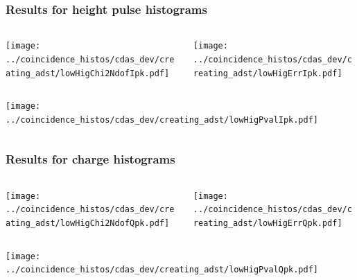 \documentclass[aspectratio=169]{beamer}
\begin{document}
\begin{frame}
  \frametitle{Results for height pulse histograms}

  \begin{columns} 
    \begin{column}{0.5\textwidth}
      \texttt{[image: ../coincidence\_histos/cdas\_dev/creating\_adst/lowHigChi2NdofIpk.pdf]}
    \end{column}

    \begin{column}{0.5\textwidth}
      \texttt{[image: ../coincidence\_histos/cdas\_dev/creating\_adst/lowHigErrIpk.pdf]}
    \end{column}
  \end{columns}

  \begin{columns}
    \begin{column}{0.5\textwidth}
      \texttt{[image: ../coincidence\_histos/cdas\_dev/creating\_adst/lowHigPvalIpk.pdf]}
    \end{column}
  \end{columns}

\end{frame}

\begin{frame}
  \frametitle{Results for charge histograms}

  \begin{columns}  
    \begin{column}{0.5\textwidth}
      \texttt{[image: ../coincidence\_histos/cdas\_dev/creating\_adst/lowHigChi2NdofQpk.pdf]}
    \end{column}

    \begin{column}{0.5\textwidth}
      \texttt{[image: ../coincidence\_histos/cdas\_dev/creating\_adst/lowHigErrQpk.pdf]}
    \end{column}
  \end{columns}

  \begin{columns}
    \begin{column}{0.5\textwidth}
      \texttt{[image: ../coincidence\_histos/cdas\_dev/creating\_adst/lowHigPvalQpk.pdf]}
    \end{column}
  \end{columns}

\end{frame}
\end{document}
